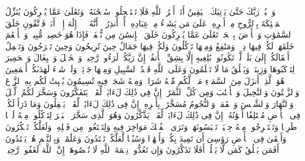 \startbuffer[\q:15:99]
وَٱعۡبُدۡ رَبَّكَ حَتَّىٰ یَأۡتِیَكَ ٱلۡیَقِینُ%
\stopbuffer%
\startbuffer[\q:16:1]
أَتَىٰۤ أَمۡرُ ٱللَّهِ فَلَا تَسۡتَعۡجِلُوهُۚ سُبۡحَٰنَهُۥ وَتَعَٰلَىٰ عَمَّا یُشۡرِكُونَ%
\stopbuffer%
\startbuffer[\q:16:2]
یُنَزِّلُ ٱلۡمَلَٰۤئِكَةَ بِٱلرُّوحِ مِنۡ أَمۡرِهِۦ عَلَىٰ مَن یَشَاۤءُ مِنۡ عِبَادِهِۦۤ أَنۡ أَنذِرُوۤا۟ أَنَّهُۥ لَاۤ إِلَٰهَ إِلَّاۤ أَنَا۠ فَٱتَّقُونِ%
\stopbuffer%
\startbuffer[\q:16:3]
خَلَقَ ٱلسَّمَٰوَٰتِ وَٱلۡأَرۡضَ بِٱلۡحَقِّۚ تَعَٰلَىٰ عَمَّا یُشۡرِكُونَ%
\stopbuffer%
\startbuffer[\q:16:4]
خَلَقَ ٱلۡإِنسَٰنَ مِن نُّطۡفَةࣲ فَإِذَا هُوَ خَصِیمࣱ مُّبِینࣱ%
\stopbuffer%
\startbuffer[\q:16:5]
وَٱلۡأَنۡعَٰمَ خَلَقَهَاۖ لَكُمۡ فِیهَا دِفۡءࣱ وَمَنَٰفِعُ وَمِنۡهَا تَأۡكُلُونَ%
\stopbuffer%
\startbuffer[\q:16:6]
وَلَكُمۡ فِیهَا جَمَالٌ حِینَ تُرِیحُونَ وَحِینَ تَسۡرَحُونَ%
\stopbuffer%
\startbuffer[\q:16:7]
وَتَحۡمِلُ أَثۡقَالَكُمۡ إِلَىٰ بَلَدࣲ لَّمۡ تَكُونُوا۟ بَٰلِغِیهِ إِلَّا بِشِقِّ ٱلۡأَنفُسِۚ إِنَّ رَبَّكُمۡ لَرَءُوفࣱ رَّحِیمࣱ%
\stopbuffer%
\startbuffer[\q:16:8]
وَٱلۡخَیۡلَ وَٱلۡبِغَالَ وَٱلۡحَمِیرَ لِتَرۡكَبُوهَا وَزِینَةࣰۚ وَیَخۡلُقُ مَا لَا تَعۡلَمُونَ%
\stopbuffer%
\startbuffer[\q:16:9]
وَعَلَى ٱللَّهِ قَصۡدُ ٱلسَّبِیلِ وَمِنۡهَا جَاۤئِرࣱۚ وَلَوۡ شَاۤءَ لَهَدَىٰكُمۡ أَجۡمَعِینَ%
\stopbuffer%
\startbuffer[\q:16:10]
هُوَ ٱلَّذِیۤ أَنزَلَ مِنَ ٱلسَّمَاۤءِ مَاۤءࣰۖ لَّكُم مِّنۡهُ شَرَابࣱ وَمِنۡهُ شَجَرࣱ فِیهِ تُسِیمُونَ%
\stopbuffer%
\startbuffer[\q:16:11]
یُنۢبِتُ لَكُم بِهِ ٱلزَّرۡعَ وَٱلزَّیۡتُونَ وَٱلنَّخِیلَ وَٱلۡأَعۡنَٰبَ وَمِن كُلِّ ٱلثَّمَرَٰتِۚ إِنَّ فِی ذَٰلِكَ لَءَایَةࣰ لِّقَوۡمࣲ یَتَفَكَّرُونَ%
\stopbuffer%
\startbuffer[\q:16:12]
وَسَخَّرَ لَكُمُ ٱلَّیۡلَ وَٱلنَّهَارَ وَٱلشَّمۡسَ وَٱلۡقَمَرَۖ وَٱلنُّجُومُ مُسَخَّرَٰتُۢ بِأَمۡرِهِۦۤۚ إِنَّ فِی ذَٰلِكَ لَءَایَٰتࣲ لِّقَوۡمࣲ یَعۡقِلُونَ%
\stopbuffer%
\startbuffer[\q:16:13]
وَمَا ذَرَأَ لَكُمۡ فِی ٱلۡأَرۡضِ مُخۡتَلِفًا أَلۡوَٰنُهُۥۤۚ إِنَّ فِی ذَٰلِكَ لَءَایَةࣰ لِّقَوۡمࣲ یَذَّكَّرُونَ%
\stopbuffer%
\startbuffer[\q:16:14]
وَهُوَ ٱلَّذِی سَخَّرَ ٱلۡبَحۡرَ لِتَأۡكُلُوا۟ مِنۡهُ لَحۡمࣰا طَرِیࣰّا وَتَسۡتَخۡرِجُوا۟ مِنۡهُ حِلۡیَةࣰ تَلۡبَسُونَهَاۖ وَتَرَى ٱلۡفُلۡكَ مَوَاخِرَ فِیهِ وَلِتَبۡتَغُوا۟ مِن فَضۡلِهِۦ وَلَعَلَّكُمۡ تَشۡكُرُونَ%
\stopbuffer%
\startbuffer[\q:16:15]
وَأَلۡقَىٰ فِی ٱلۡأَرۡضِ رَوَٰسِیَ أَن تَمِیدَ بِكُمۡ وَأَنۡهَٰرࣰا وَسُبُلࣰا لَّعَلَّكُمۡ تَهۡتَدُونَ%
\stopbuffer%
\startbuffer[\q:16:16]
وَعَلَٰمَٰتࣲۚ وَبِٱلنَّجۡمِ هُمۡ یَهۡتَدُونَ%
\stopbuffer%
\startbuffer[\q:16:17]
أَفَمَن یَخۡلُقُ كَمَن لَّا یَخۡلُقُۚ أَفَلَا تَذَكَّرُونَ%
\stopbuffer%
\startbuffer[\q:16:18]
وَإِن تَعُدُّوا۟ نِعۡمَةَ ٱللَّهِ لَا تُحۡصُوهَاۤۗ إِنَّ ٱللَّهَ لَغَفُورࣱ رَّحِیمࣱ%
\stopbuffer%
